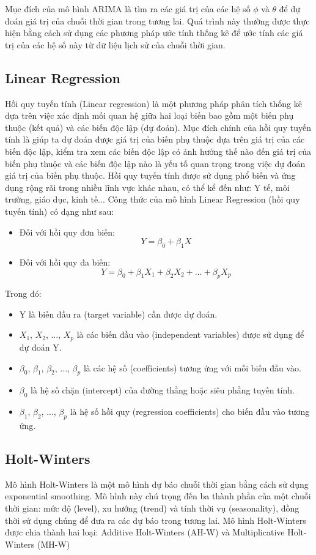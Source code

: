 \documentclass[conference]{IEEEtran}
\begin{document}
Mục đích của mô hình ARIMA là tìm ra các giá trị của các hệ số \(\phi\) và \(\theta\) để dự đoán giá trị của chuỗi thời gian trong tương lai. Quá trình này thường được thực hiện bằng cách sử dụng các phương pháp ước tính thống kê để ước tính các giá trị của các hệ số này từ dữ liệu lịch sử của chuỗi thời gian.

\subsection{Linear Regression}
Hồi quy tuyến tính (Linear regression) là một phương pháp phân tích thống kê dựa trên việc xác định mối quan hệ giữa hai loại biến bao gồm một biến phụ thuộc (kết quả) và các biến độc lập (dự đoán). Mục đích chính của hồi quy tuyến tính là giúp ta dự đoán được giá trị của biến phụ thuộc dựa trên giá trị của các biến độc lập, kiểm tra xem các biến độc lập có ảnh hưởng thế nào đến giá trị của biến phụ thuộc và các biến độc lập nào là yếu tố quan trọng trong việc dự đoán giá trị của biến phụ thuộc. Hồi quy tuyến tính được sử dụng phổ biến và ứng dụng rộng rãi trong nhiều lĩnh vực khác nhau, có thể kể đến như: Y tế, môi trường, giáo dục, kinh tế...
Công thức của mô hình Linear Regression (hồi quy tuyến tính) có dạng như sau:
\begin{itemize}
    \item Đối với hồi quy đơn biến: 
    \[
 Y = \beta_{0}+ \beta_{1}X   
    \] 
    \item Đối với hồi quy đa biến: 
    \[
    Y = \beta_{0} + \beta_{1}X_{1} + \beta_{2}X_{2} + ... + \beta_{p}X_{p}
    \] 
\end{itemize}
Trong đó:
\begin{itemize}
    \item Y là biến đầu ra (target variable) cần được dự đoán.
    \item  \(X_{1}\), \(X_{2}\), ..., \(X_{p}\) là các biến đầu vào (independent variables) được sử dụng để dự đoán Y.
    \item \(\beta_{0}\), \(\beta_{1}\), \(\beta_{2}\), ..., \(\beta_{p}\) là các hệ số (coefficients) tương ứng với mỗi biến đầu vào.
    \item \(\beta_{0}\) là hệ số chặn (intercept) của đường thẳng hoặc siêu phẳng tuyến tính.
    \item \(\beta_{1}\), \(\beta_{2}\), ..., \(\beta_{p}\) là hệ số hồi quy (regression coefficients) cho biến đầu vào tương ứng.
\end{itemize}

\subsection{Holt-Winters}
Mô hình Holt-Winters là một mô hình dự báo chuỗi thời gian bằng cách sử dụng exponential smoothing. Mô hình này chú trọng đến ba thành phần của một chuỗi thời gian: mức độ (level), xu hướng (trend) và tính thời vụ (seasonality), đồng thời sử dụng chúng để đưa ra các dự báo trong tương lai.
Mô hình Holt-Winters được chia thành hai loại: Additive Holt-Winters (AH-W) và Multiplicative Holt-Winters (MH-W)
\end{document}
